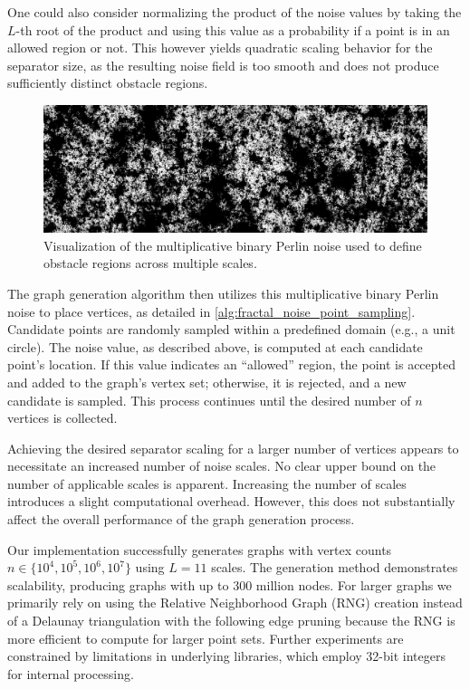 One could also consider normalizing the product of the noise values by taking the \(L\)-th root of the product and using this value as a probability if a point is in an allowed region or not.
This however yields quadratic scaling behavior for the separator size, as the resulting noise field is too smooth and does not produce sufficiently distinct obstacle regions.

\begin{figure}[tbhp]
	\centering
	\includegraphics[width=\linewidth]{graphics/noise_image.png}
	\caption{Visualization of the multiplicative binary Perlin noise used to define obstacle regions across multiple scales.}
	\label{fig:multiplicative_binary_noise_viz}
\end{figure}

The graph generation algorithm then utilizes this multiplicative binary Perlin noise to place vertices, as detailed in \cref{alg:fractal_noise_point_sampling}.
Candidate points are randomly sampled within a predefined domain (e.g., a unit circle).
The noise value, as described above, is computed at each candidate point's location. If this value indicates an \enquote{allowed} region, the point is accepted and added to the graph's vertex set; otherwise, it is rejected, and a new candidate is sampled. This process continues until the desired number of \(n\) vertices is collected.

Achieving the desired separator scaling for a larger number of vertices appears to necessitate an increased number of noise scales.
No clear upper bound on the number of applicable scales is apparent.
Increasing the number of scales introduces a slight computational overhead.
However, this does not substantially affect the overall performance of the graph generation process.

Our implementation successfully generates graphs with vertex counts \(n \in \{10^4, 10^5, 10^6, 10^7\}\) using \(L=11\) scales.
The generation method demonstrates scalability, producing graphs with up to 300 million nodes.
For larger graphs we primarily rely on using the Relative Neighborhood Graph (RNG) creation instead of a Delaunay triangulation with the following edge pruning because the RNG is more efficient to compute for larger point sets.
Further experiments are constrained by limitations in underlying libraries, which employ 32-bit integers for internal processing.

